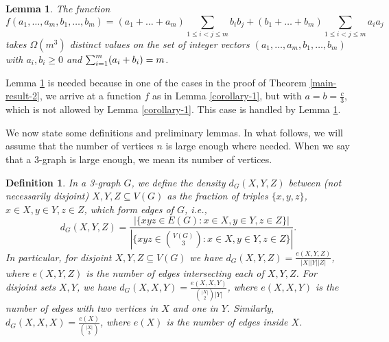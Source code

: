 \documentclass[11pt]{article}
\theoremstyle{plain}
\newtheorem{lemma}[theorem]{Lemma}
\newtheorem{definition}[theorem]{Definition}
\begin{document}

\begin{lemma} \label{additional-lemma}
    The function
	$$
	f(a_1,\dots,a_m,b_1,\dots,b_m) = (a_1 + \dots + a_m) \sum_{1 \leq i < j \leq m} b_i b_j + (b_1 + \dots + b_m) \sum_{1 \leq i < j \leq m} a_i a_j
	$$
    takes $\Omega(m^3)$ distinct values on the set of integer vectors $(a_1,\dots,a_m,b_1,\dots,b_m)$ with $a_i,b_i \geq 0$ and 
    $\sum_{i=1}^m (a_i+ \nolinebreak b_i) = m$.
\end{lemma}

Lemma \ref{additional-lemma} is needed because in one of the cases in the proof of Theorem \ref{main-result-2}, we arrive at a function $f$ as in Lemma \ref{corollary-1}, but with $a=b=\frac{c}{3}$, which is not allowed by Lemma \ref{corollary-1}. This case is handled by Lemma \ref{additional-lemma}.

We now state some definitions and preliminary lemmas. In what follows, we will assume that the number of vertices $n$ is large enough where needed. When we say that a $3$-graph is large enough, we mean its number of vertices. 

\begin{definition}
    In a 3-graph $G$, we define the {\em density} $d_G(X,Y,Z)$ between (not necessarily disjoint) $X,Y,Z \subseteq V(G)$ as the fraction of triples $\{x,y,z\}$, $x \in X,y \in Y, z \in Z$, which form edges of $G$, i.e.,
    $$d_G(X,Y,Z) = \frac{|\{xyz \in E(G) :  x \in X, y \in Y, z \in Z\}|}{|\{xyz \in \binom{V(G)}{3} : x \in X, y \in Y, z \in Z\}|}.$$ 
    In particular, for disjoint $X,Y,Z \subseteq V(G)$ we have 
    $d_G(X,Y,Z) = \frac{e(X,Y,Z)}{|X||Y||Z|}$, where $e(X,Y,Z)$ is the number of edges intersecting each of $X,Y,Z$. For disjoint sets $X,Y$, we have
    $d_G(X,X,Y) = \frac{e(X,X,Y)}{\binom{|X|}{2}|Y|}$, where $e(X,X,Y)$ is the number of edges with two vertices in $X$ and one in $Y$. Similarly, $d_G(X,X,X) = \frac{e(X)}{\binom{|X|}{3}}$, where $e(X)$ is the number of edges inside $X$. 
\end{definition}
\end{document}
